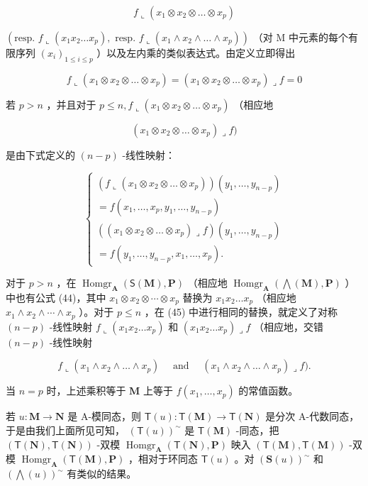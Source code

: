 \[
f \llcorner (x _ {1} \otimes x _ {2} \otimes \dots \otimes x _ {p})
\]

\((\text{resp. } f \llcorner (x_1 x_2 \ldots x_p), \text{ resp. } f \llcorner (x_1 \wedge x_2 \wedge \dots \wedge x_p))\) （对 M 中元素的每个有限序列 \((x_i)_{1 \leq i \leq p}\) ）以及左内乘的类似表达式。由定义立即得出

\[
f \llcorner (x _ {1} \otimes x _ {2} \otimes \dots \otimes x _ {p}) = (x _ {1} \otimes x _ {2} \otimes \dots \otimes x _ {p}) \lrcorner f = 0\tag{44}
\]

若 \(p > n\) ，并且对于 \(p \leqslant n, f \llcorner (x_1 \otimes x_2 \otimes \dots \otimes x_p)\) （相应地

\[
\left(x _ {1} \otimes x _ {2} \otimes \dots \otimes x _ {p}\right) \lrcorner f)
\]

是由下式定义的 \((n - p)\) -线性映射：

\[
\left\{ \begin{array}{l} (f \llcorner (x _ {1} \otimes x _ {2} \otimes \dots \otimes x _ {p})) (y _ {1}, \ldots , y _ {n - p}) \\ = f (x _ {1}, \ldots , x _ {p}, y _ {1}, \ldots , y _ {n - p}) \\ ((x _ {1} \otimes x _ {2} \otimes \dots \otimes x _ {p}) \lrcorner f) (y _ {1}, \ldots , y _ {n - p}) \\ = f (y _ {1}, \ldots , y _ {n - p}, x _ {1}, \ldots , x _ {p}). \end{array} \right.\tag{45}
\]

对于 \(p > n\) ，在 \(\operatorname{Homgr}_{\mathbf{A}}(\mathsf{S}(\mathbf{M}), \mathbf{P})\) （相应地 \(\operatorname{Homgr}_{\mathbf{A}}(\bigwedge(\mathbf{M}), \mathbf{P})\) ）中也有公式 (44)，其中 \(x_1 \otimes x_2 \otimes \cdots \otimes x_p\) 替换为 \(x_1x_2 \ldots x_p\) （相应地 \(x_1 \wedge x_2 \wedge \cdots \wedge x_p\) ）。对于 \(p \leqslant n\) ，在 (45) 中进行相同的替换，就定义了对称 \((n - p)\) -线性映射 \(f \llcorner (x_1x_2 \ldots x_p)\) 和 \((x_1x_2 \ldots x_p) \lrcorner f\) （相应地，交错 \((n - p)\) -线性映射

\[
f \llcorner (x _ {1} \wedge x _ {2} \wedge \dots \wedge x _ {p}) \quad \text { and } \quad (x _ {1} \wedge x _ {2} \wedge \dots \wedge x _ {p}) \lrcorner f).
\]

当 \(n = p\) 时，上述乘积等于 \(\mathbf{M}\) 上等于 \(f(x_{1},\ldots ,x_{p})\) 的常值函数。

若 \(u: \mathbf{M} \to \mathbf{N}\) 是 A-模同态，则 \(\mathsf{T}(u): \mathsf{T}(\mathbf{M}) \to \mathsf{T}(\mathbf{N})\) 是分次 A-代数同态，于是由我们上面所见可知， \((\mathsf{T}(u))^{\sim}\) 是 \(\mathsf{T}(\mathbf{M})\) -同态，把 \((\mathsf{T}(\mathbf{N}), \mathsf{T}(\mathbf{N}))\) -双模 \(\operatorname{Homgr}_{\mathbf{A}}(\mathsf{T}(\mathbf{N}), \mathbf{P})\) 映入 \((\mathsf{T}(\mathbf{M}), \mathsf{T}(\mathbf{M}))\) -双模 \(\operatorname{Homgr}_{\mathbf{A}}(\mathsf{T}(\mathbf{M}), \mathbf{P})\) ，相对于环同态 \(\mathsf{T}(u)\) 。对 \((\mathbf{S}(u))^{\sim}\) 和 \((\bigwedge(u))^{\sim}\) 有类似的结果。
